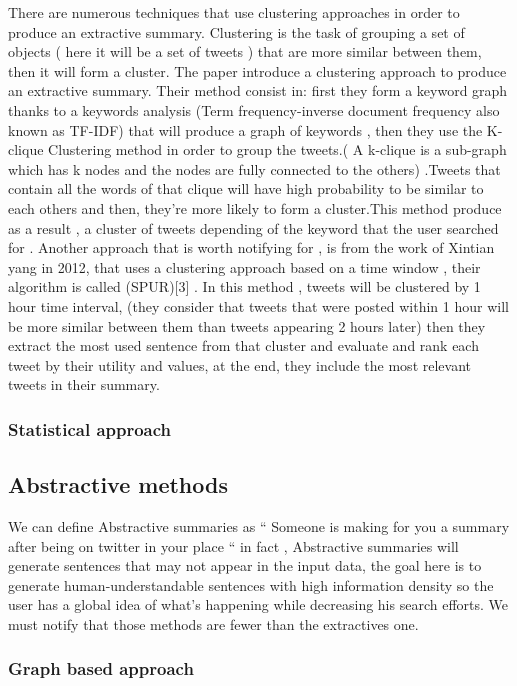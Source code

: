 \documentclass[a4paper, twocolumn]{article}
\begin{document}
There are numerous techniques that use clustering approaches in order to
produce an extractive summary. Clustering is the task of grouping a set of
objects ( here it will be a set of tweets ) that are more similar between them,
then it will  form a cluster.
The paper \textcite{kim_tweet_2014} introduce a clustering approach to produce
an extractive summary. Their method consist in:  first they form a keyword
graph thanks to a keywords analysis (Term frequency-inverse document frequency
also known as TF-IDF) that will produce a graph of keywords , then they use the
K-clique Clustering method in order to group the tweets.( A k-clique is a
sub-graph which has k nodes and the nodes are fully connected to the others)
.Tweets that contain all the words of that clique will have high probability to
be similar to each others and then, they’re more likely to form a cluster.This
method produce as a result , a cluster of tweets depending of the keyword that
the user searched for . Another approach that is worth notifying for , is from
the work of Xintian yang in 2012, that uses a clustering approach based on a
time window , their algorithm is called (SPUR)[3] . In this method , tweets
will be clustered by 1 hour time interval, (they consider that tweets that were
posted within 1 hour will be more similar between them than tweets appearing 2
hours later) then  they extract the most used sentence from that cluster and
evaluate and rank each tweet by their utility and values, at the end, they
include the most relevant tweets in their summary.


\subsubsection{Statistical approach}

\subsection{Abstractive methods}

We can define Abstractive summaries as “ Someone is making for you a summary
after being on twitter in your place “ in fact , Abstractive summaries will
generate sentences that may not appear in the input data, the goal here is to
generate human-understandable sentences with high information density so the
user has a global idea of what’s happening while decreasing his search efforts.
We must notify that those methods are fewer than the extractives one.

\subsubsection{Graph based approach}
\end{document}
